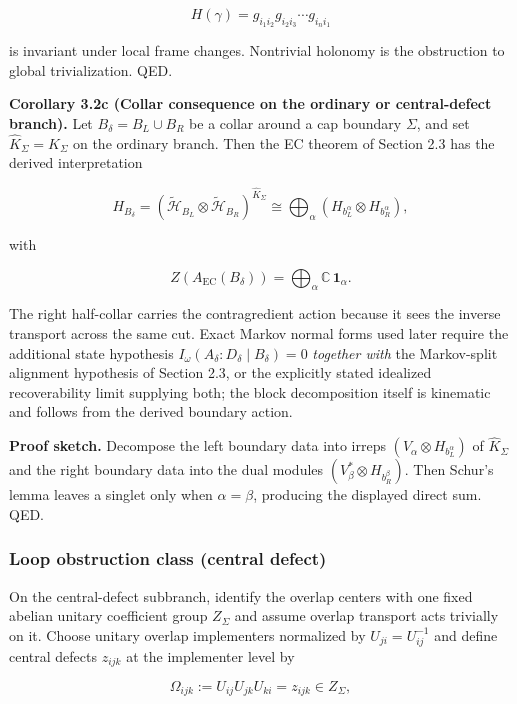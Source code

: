 \[
H(\gamma) = g_{i_1 i_2} g_{i_2 i_3} \cdots g_{i_n i_1}
\]

is invariant under local frame changes. Nontrivial holonomy is the obstruction to global trivialization. QED.

\textbf{Corollary 3.2c (Collar consequence on the ordinary or central-defect branch).} Let \(B_\delta = B_L \cup B_R\) be a collar around a cap boundary \(\Sigma\), and set \(\widehat K_\Sigma = K_\Sigma\) on the ordinary branch. Then the EC theorem of Section 2.3 has the derived interpretation

\[
H_{B_\delta}
=
(\tilde{\mathcal H}_{B_L}\otimes \tilde{\mathcal H}_{B_R})^{\widehat K_\Sigma}
\cong
\bigoplus_\alpha
(H_{b_L^\alpha}\otimes H_{b_R^\alpha}),
\]

with

\[
Z(A_{\mathrm{EC}}(B_\delta)) = \bigoplus_\alpha \mathbb C\,\mathbf 1_\alpha.
\]

The right half-collar carries the contragredient action because it sees the inverse transport across the same cut. Exact Markov normal forms used later require the additional state hypothesis \(I_\omega(A_\delta:D_\delta \mid B_\delta)=0\) \emph{together with} the Markov-split alignment hypothesis of Section 2.3, or the explicitly stated idealized recoverability limit supplying both; the block decomposition itself is kinematic and follows from the derived boundary action.

\textbf{Proof sketch.} Decompose the left boundary data into irreps \((V_\alpha \otimes H_{b_L^\alpha})\) of \(\widehat K_\Sigma\) and the right boundary data into the dual modules \((V_\beta^* \otimes H_{b_R^\beta})\). Then Schur's lemma leaves a singlet only when \(\alpha=\beta\), producing the displayed direct sum. QED.

\subsubsection{Loop obstruction class (central defect)}\label{33-loop-obstruction-class-central-defect}

On the central-defect subbranch, identify the overlap centers with one fixed abelian unitary
coefficient group \(Z_\Sigma\) and assume overlap transport acts trivially on it. Choose unitary
overlap implementers normalized by \(U_{ji}=U_{ij}^{-1}\) and define central defects
\(z_{ijk}\) at the implementer level by

\[
\Omega_{ijk}:=U_{ij}U_{jk}U_{ki}=z_{ijk}
\in Z_\Sigma,
\]

